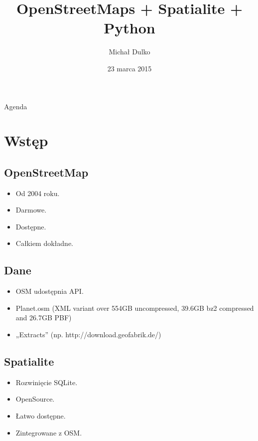 \documentclass{beamer}
\title{OpenStreetMaps + Spatialite + Python}
\author{Michał Dulko}
\date{23 marca 2015}
\begin{document}
	\begin{frame}
		\titlepage
	\end{frame}

	\begin{frame}{Agenda}
		\setcounter{tocdepth}{1}
		\tableofcontents
	\end{frame}

	\section{Wstęp}
		\subsection{OpenStreetMap}
			\begin{frame}{\insertsubsectionhead}
				\begin{itemize}
					\item Od 2004 roku.
					\item Darmowe.
					\item Dostępne.
					\item Całkiem dokładne.
				\end{itemize}
			\end{frame}

		\subsection{Dane}
			\begin{frame}{\insertsubsectionhead}
				\begin{itemize}
					\item OSM udostępnia API.
					\item Planet.osm \pause(XML variant over 554GB uncompressed, 39.6GB bz2 compressed and 26.7GB PBF)
					\item „Extracts” (np. http://download.geofabrik.de/)
				\end{itemize}
			\end{frame}


		\subsection{Spatialite}
			\begin{frame}{\insertsubsectionhead}
				\begin{itemize}
					\item Rozwinięcie SQLite.
					\item OpenSource.
					\item Łatwo dostępne.
					\item Zintegrowane z OSM.
				\end{itemize}
			\end{frame}
		
\end{document}
